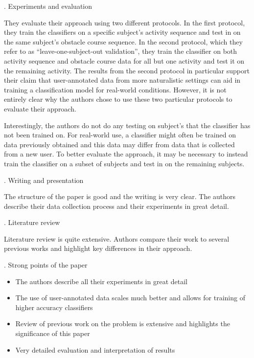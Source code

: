 \documentclass[12pt]{article}
\newenvironment{indentpar}
    {\vspace{0.25cm}\hfill\begin{minipage}{\dimexpr\textwidth-1cm}}
    {\end{minipage}\vspace{0.3cm}}
\begin{document}
. Experiments and evaluation

\begin{indentpar}
They evaluate their approach using two different protocols. In the first protocol, they train the classifiers on a specific subject's activity sequence and test in on the same subject's obstacle course sequence. In the second protocol, which they refer to as ``leave-one-subject-out validation'', they train the classifier on both activity sequence and obstacle course data for all but one activity and test it on the remaining activity. The results from the second protocol in particular support their claim that user-annotated data from more naturalistic settings can aid in training a classification model for real-world conditions. However, it is not entirely clear why the authors chose to use these two particular protocols to evaluate their approach.

Interestingly, the authors do not do any testing on subject's that the classifier has not been trained on. For real-world use, a classifier might often be trained on data previously obtained and this data may differ from data that is collected from a new user. To better evaluate the approach, it may be necessary to instead train the classifier on a subset of subjects and test in on the remaining subjects.
\end{indentpar}

. Writing and presentation

\begin{indentpar}
The structure of the paper is good and the writing is very clear. The authors describe their data collection process and their experiments in great detail.
\end{indentpar}

. Literature review

\begin{indentpar}
Literature review is quite extensive. Authors compare their work to several previous works and highlight key differences in their approach.  
\end{indentpar}

. Strong points of the paper

\begin{itemize}
    \item The authors describe all their experiments in great detail
    \item The use of user-annotated data scales much better and allows for training of higher accuracy classifiers 
    \item Review of previous work on the problem is extensive and highlights the significance of this paper
    \item Very detailed evaluation and interpretation of results
\end{itemize}
\end{document}
